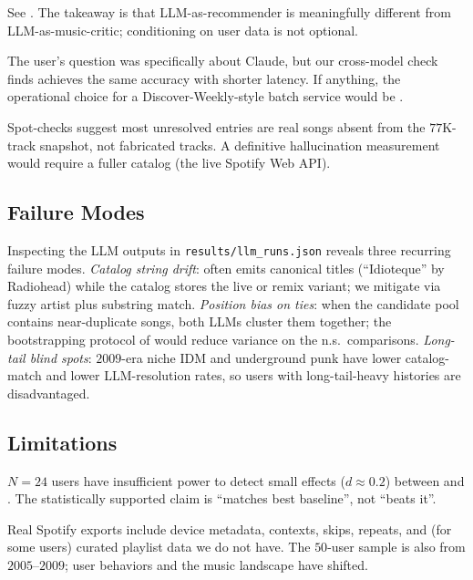  See . The takeaway is that LLM-as-recommender is meaningfully different from LLM-as-music-critic; conditioning on user data is not optional.

 The user's question was specifically about Claude, but our cross-model check finds \gpt achieves the same accuracy with shorter latency. If anything, the operational choice for a Discover-Weekly-style batch service would be \gpt.

 Spot-checks suggest most unresolved entries are real songs absent from the $77$K-track \spotcat snapshot, not fabricated tracks. A definitive hallucination measurement would require a fuller catalog (\eg the live Spotify Web API).

\subsection{Failure Modes}

Inspecting the LLM outputs in \texttt{results/llm\_runs.json} reveals three recurring failure modes. \emph{Catalog string drift}: \claude often emits canonical titles (``Idioteque'' by Radiohead) while the catalog stores the live or remix variant; we mitigate via fuzzy artist plus substring match. \emph{Position bias on ties}: when the candidate pool contains near-duplicate songs, both LLMs cluster them together; the bootstrapping protocol of \citet{hou2024llm} would reduce variance on the n.s.\ comparisons. \emph{Long-tail blind spots}: \lastfm $2009$-era niche IDM and underground punk have lower catalog-match and lower LLM-resolution rates, so users with long-tail-heavy histories are disadvantaged.

\subsection{Limitations}
\label{sec:limitations}

 $N{=}24$ users have insufficient power to detect small effects ($d{\approx}0.2$) between \claude and \cbf. The statistically supported claim is ``matches best baseline'', not ``beats it''.

 Real Spotify exports include device metadata, contexts, skips, repeats, and (for some users) curated playlist data we do not have. The $50$-user \lastfm sample is also from $2005$--$2009$; user behaviors and the music landscape have shifted.


